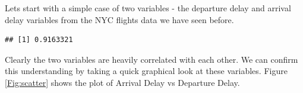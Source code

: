 \documentclass[10pt, letterpaper, twoside]{memoir}\usepackage{knitr}
\begin{document}
Lets start with a simple case of two variables - the departure delay and arrival delay variables from the NYC flights data we have seen before.

\begin{knitrout}
\color{fgcolor}\begin{kframe}
\begin{alltt}
 \hlkwb{<-} \hlstd{(}\hlstd{)}
\end{alltt}
\end{kframe}
\end{knitrout}

\begin{knitrout}
\color{fgcolor}\begin{kframe}
\begin{alltt}
\end{alltt}
\end{kframe}
\end{knitrout}

\begin{knitrout}
\color{fgcolor}\begin{kframe}
\begin{alltt}
  \hlstd{=} \hlstd{)}
\end{alltt}
\begin{verbatim}
## [1] 0.9163321
\end{verbatim}
\end{kframe}
\end{knitrout}

  Clearly the two variables are heavily correlated with each other. We can confirm this understanding by taking a quick graphical look at these variables. Figure \ref{Fig:scatter}  shows the plot of Arrival Delay vs Departure Delay. 
\end{document}
